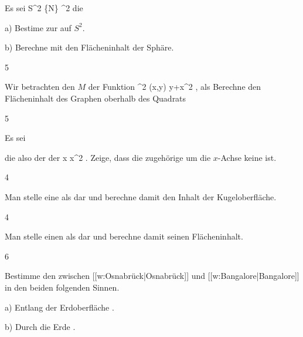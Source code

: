 {}
{

Es sei
\maabbdisp {\alpha} {S^2 \setminus \{N\}} { \R^2
} {}
die

a) Bestime
\mathl{\alpha_* \omega}{} zur
auf $S^2$.

b) Berechne mit
\mathl{\alpha_* \omega}{} den Flächeninhalt der Sphäre.

}
{} {}


{5}
{

Wir betrachten den
$M$ der Funktion
\maabbeledisp {\psi} {\R^2} {\R
} {(x,y)} { y+x^2
} {,}
als
Berechne den Flächeninhalt des Graphen oberhalb des Quadrats

}
{} {}

{5}
{

Es sei

 {  }

die
also der
der
\maabbeledisp {} {\R} {\R
} { x } { x^2
} {.}
Zeige, dass die zugehörige
um die $x$-Achse keine
ist.

}
{} {}

{4}
{

Man stelle eine
 als
 dar und berechne damit den Inhalt der Kugeloberfläche.

}
{} {}

{4}
{

Man stelle einen
 als
 dar und berechne damit seinen Flächeninhalt.

}
{} {}

{6}
{

Bestimme den   zwischen [[w:Osnabrück|Osnabrück]] und [[w:Bangalore|Bangalore]]
 {} {}
in den beiden folgenden Sinnen.

a) Entlang der Erdoberfläche
 {} {.}

b) Durch die Erde
 {} {.}

}
{} {}

